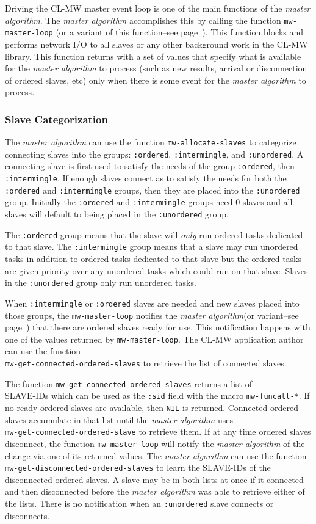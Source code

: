 \documentclass[titlepage,12pt]{book}
\newcommand{\xsmall}{\latexhtml{\small}{}}
\newcommand{\xnormalsize}{\latexhtml{\normalsize}{}}
\newcommand{\clmw}{\xsmall\textsc{CL-MW}\xnormalsize\xspace}
\newcommand{\ma}{\textit{master algorithm}\xspace}
\newcommand{\un}{\texttt{:unordered}\xspace}
\newcommand{\inter}{\texttt{:intermingle}\xspace}
\newcommand{\ord}{\texttt{:ordered}\xspace}
\newcommand{\func}[1]{\mbox{\texttt{#1}}\xspace}
\newcommand{\macro}[1]{\mbox{\texttt{#1}}\xspace}
\newcommand{\bool}[1]{\texttt{#1}\xspace}
\begin{document}
Driving the \clmw master event loop is one of the main functions
of the \ma. The \ma accomplishes this by calling the function
\func{mw-master-loop} (or a variant of this function--see
page~\pageref{master-algorithm-api}). This function blocks and performs
network I/O to all slaves or any other background work in the \clmw
library. This function returns with a set of values that specify what
is available for the \ma to process (such as new results, arrival
or disconnection of ordered slaves, etc) only when there is some
event for the \ma to process.

\subsubsection{Slave Categorization}

The \ma can use the function \func{mw-allocate-slaves} to categorize
connecting slaves into the groups: \ord, \inter, and \un.  A connecting
slave is first used to satisfy the needs of the group \ord, then
\inter.  If enough slaves connect as to satisfy the needs for both
the \ord and \inter groups, then they are placed into the \un group.
Initially the \ord and \inter groups need 0 slaves and all slaves will
default to being placed in the \un group.

The \ord group means that the slave will \emph{only} run ordered tasks
dedicated to that slave. The \inter group means that a slave may run
unordered tasks in addition to ordered tasks dedicated to that slave
but the ordered tasks are given priority over any unordered tasks
which could run on that slave. Slaves in the \un group only run
unordered tasks.

When \inter or \ord slaves are needed and new slaves placed into
those groups, the \func{mw-master-loop} notifies the \ma (or
variant--see page~\pageref{master-algorithm-api}) that there are
ordered slaves ready for use. This notification happens with one of
the values returned by \func{mw-master-loop}. The \clmw application
author can use the function \\ \func{mw-get-connected-ordered-slaves} to
retrieve the list of connected slaves.

The function \func{mw-get-connected-ordered-slaves} returns a list
of \\ SLAVE-IDs which can be used as the \texttt{:sid} field with the
macro \macro{mw-funcall-*}.  If no ready ordered slaves are available,
then \bool{NIL} is returned. Connected ordered slaves accumulate in that
list until the \ma uses \\ \func{mw-get-connected-ordered-slave}
to retrieve them.  If at any time ordered slaves disconnect, the
function \func{mw-master-loop} will notify the \ma of the change
via one of its returned values.  The \ma can use the function
\func{mw-get-disconnected-ordered-slaves} to learn the SLAVE-IDs
of the disconnected ordered slaves. A slave may be in both lists at
once if it connected and then disconnected before the \ma was able
to retrieve either of the lists. There is no notification when an
\un slave connects or disconnects.
\end{document}
